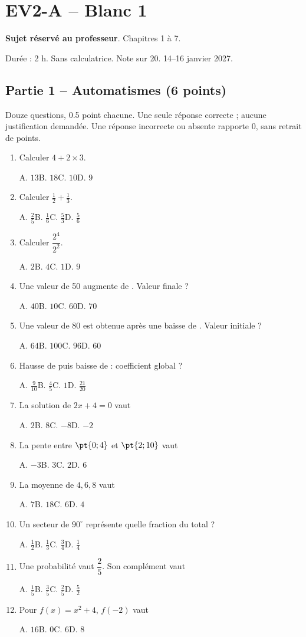\mxnewpage\section*{EV2-A -- Blanc 1}\label{EV2-A}
\textbf{Sujet réservé au professeur}. Chapitres 1 à 7.\par Durée : 2 h. Sans calculatrice. Note sur 20. 14–16 janvier 2027.
\subsection*{Partie 1 -- Automatismes (6 points)}
Douze questions, \num{0,5} point chacune. Une seule réponse correcte ; aucune justification demandée. Une réponse incorrecte ou absente rapporte 0, sans retrait de points.
\begin{enumerate}
\item Calculer $4+2\times3$.\par A. $13$\quad B. $18$\quad C. $10$\quad D. $9$
\item Calculer $\frac12+\frac13$.\par A. $\frac{2}{5}$\quad B. $\frac{1}{6}$\quad C. $\frac{5}{3}$\quad D. $\frac{5}{6}$
\item Calculer $\dfrac{2^4}{2^{2}}$.\par A. $2$\quad B. $4$\quad C. $1$\quad D. $9$
\item Une valeur de 50 augmente de . Valeur finale ?\par A. $40$\quad B. $10$\quad C. $60$\quad D. $70$
\item Une valeur de 80 est obtenue après une baisse de . Valeur initiale ?\par A. $64$\quad B. $100$\quad C. $96$\quad D. $60$
\item Hausse de  puis baisse de  : coefficient global ?\par A. $\frac{9}{10}$\quad B. $\frac{4}{5}$\quad C. $1$\quad D. $\frac{21}{20}$
\item La solution de $2x+4=0$ vaut\par A. $2$\quad B. $8$\quad C. $-8$\quad D. $-2$
\item La pente entre $\pt{0;4}$ et $\pt{2;10}$ vaut\par A. $-3$\quad B. $3$\quad C. $2$\quad D. $6$
\item La moyenne de $4, 6, 8$ vaut\par A. $7$\quad B. $18$\quad C. $6$\quad D. $4$
\item Un secteur de $90^\circ$ représente quelle fraction du total ?\par A. $\frac{1}{2}$\quad B. $\frac{1}{3}$\quad C. $\frac{3}{4}$\quad D. $\frac{1}{4}$
\item Une probabilité vaut $\dfrac{2}{5}$. Son complément vaut\par A. $\frac{1}{5}$\quad B. $\frac{3}{5}$\quad C. $\frac{2}{5}$\quad D. $\frac{5}{2}$
\item Pour $f(x)=x^2+4$, $f(-2)$ vaut\par A. $16$\quad B. $0$\quad C. $6$\quad D. $8$
\end{enumerate}
